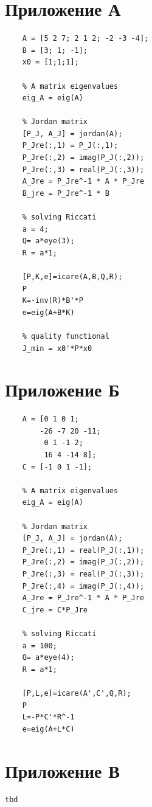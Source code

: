 \documentclass[a4paper, 12pt]{article}
\begin{document}
    \section{Приложение А}
    \begin{lstlisting}[label=task1, caption={Программа для задания 1}]
    % plant parameters
    A = [5 2 7; 2 1 2; -2 -3 -4];
    B = [3; 1; -1];
    x0 = [1;1;1];

    % A matrix eigenvalues
    eig_A = eig(A)

    % Jordan matrix
    [P_J, A_J] = jordan(A);
    P_Jre(:,1) = P_J(:,1);
    P_Jre(:,2) = imag(P_J(:,2));
    P_Jre(:,3) = real(P_J(:,3));
    A_Jre = P_Jre^-1 * A * P_Jre
    B_jre = P_Jre^-1 * B

    % solving Riccati
    a = 4;
    Q= a*eye(3);
    R = a*1;

    [P,K,e]=icare(A,B,Q,R);
    P
    K=-inv(R)*B'*P
    e=eig(A+B*K)

    % quality functional
    J_min = x0'*P*x0
    \end{lstlisting}


    \section{Приложение Б}
    \begin{lstlisting}[label=task2, caption={Программа для задания 2}]
    % plant parameters
    A = [0 1 0 1;
        -26 -7 20 -11;
         0 1 -1 2;
         16 4 -14 8];
    C = [-1 0 1 -1];

    % A matrix eigenvalues
    eig_A = eig(A)

    % Jordan matrix
    [P_J, A_J] = jordan(A);
    P_Jre(:,1) = real(P_J(:,1));
    P_Jre(:,2) = imag(P_J(:,2));
    P_Jre(:,3) = real(P_J(:,3));
    P_Jre(:,4) = imag(P_J(:,4));
    A_Jre = P_Jre^-1 * A * P_Jre
    C_jre = C*P_Jre

    % solving Riccati
    a = 100;
    Q= a*eye(4);
    R = a*1;

    [P,L,e]=icare(A',C',Q,R);
    P
    L=-P*C'*R^-1
    e=eig(A+L*C)
    \end{lstlisting}


    \section{Приложение В}
    \begin{lstlisting}[label=task3, caption={Программа для задания 3}]
        tbd
    \end{lstlisting}
\end{document}
